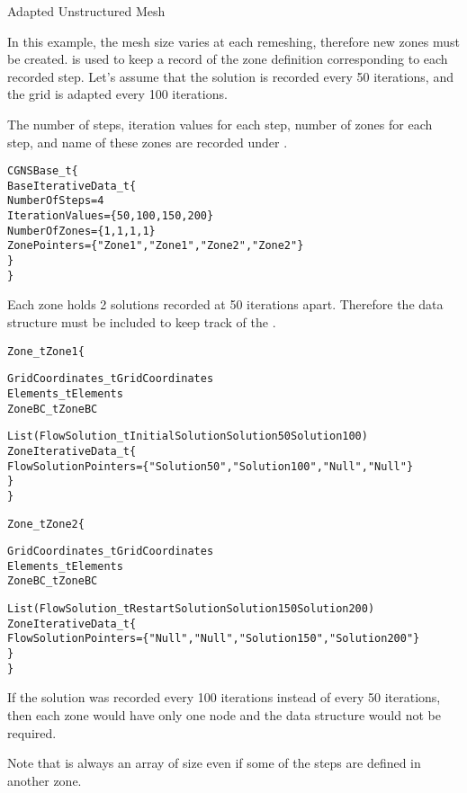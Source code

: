 \begin{example}{Adapted Unstructured Mesh}
\label{ex:adaptedunstructuredmesh}

In this example, the mesh size varies at each remeshing, therefore new
zones must be created.
 is used to keep a record of the zone definition
corresponding to each recorded step.
Let's assume that the solution is recorded every 50 iterations, and the
grid is adapted every 100 iterations.

The number of steps, iteration values for each step, number of zones
for each step, and name of these zones are recorded under
.

\begin{alltt}
  CGNSBase\_t \{
    BaseIterativeData\_t \{
      NumberOfSteps = 4
      IterationValues = \{50, 100, 150, 200\}
      NumberOfZones = \{1, 1, 1, 1\}
      ZonePointers = \{"Zone1", "Zone1", "Zone2", "Zone2"\}
    \}
  \}
\end{alltt}

Each zone holds 2 solutions recorded at 50 iterations apart.
Therefore the  data structure must be included
to keep track of the .

\begin{alltt}
  Zone\_t Zone1 \{

    GridCoordinates\_t GridCoordinates
    Elements\_t Elements
    ZoneBC\_t ZoneBC

    List ( FlowSolution\_t InitialSolution Solution50 Solution100 )
    ZoneIterativeData\_t \{
      FlowSolutionPointers = \{"Solution50", "Solution100", "Null", "Null"\}
    \}
  \}

  Zone\_t Zone2 \{

    GridCoordinates\_t GridCoordinates
    Elements\_t Elements
    ZoneBC\_t ZoneBC

    List ( FlowSolution\_t RestartSolution Solution150 Solution200 )
    ZoneIterativeData\_t \{
      FlowSolutionPointers = \{"Null", "Null", "Solution150", "Solution200"\}
    \}
  \}
\end{alltt}
\end{example}

\begin{notes}
\item If the solution was recorded every 100 iterations instead of
      every 50 iterations, then each zone would have only one
       node and the data structure
       would not be required.
\item Note that  is always an array of size
       even if some of the steps are defined in
      another zone.
\end{notes}

